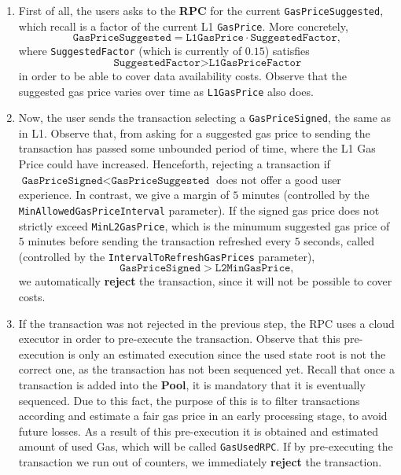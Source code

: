\begin{enumerate}

\item First of all, the users asks to the \textbf{RPC} for the current \texttt{GasPriceSuggested}, which recall is a factor of the current L1 \texttt{GasPrice}. More concretely,
\[
\texttt{GasPriceSuggested} = \texttt{L1GasPrice} \cdot \texttt{SuggestedFactor},
\]
where \texttt{SuggestedFactor} (which is currently of $0.15$) satisfies
\[
\texttt{SuggestedFactor} > \texttt{L1GasPriceFactor}
\]
in order to be able to cover data availability costs. Observe that the suggested gas price varies over time as \texttt{L1GasPrice} also does.

\item Now, the user sends the transaction selecting a \texttt{GasPriceSigned}, the same as in L1. Observe that, from asking for a suggested gas price to sending the transaction has passed some unbounded period of time, where the L1 Gas Price could have increased. Henceforth, rejecting a transaction if $\texttt{GasPriceSigned} < \texttt{GasPriceSuggested}$ does not offer a good user experience. In contrast, we give a margin of $5$ minutes (controlled by the \texttt{MinAllowedGasPriceInterval} parameter). If the signed gas price does not strictly exceed \texttt{MinL2GasPrice}, which is the minumum suggested gas price of $5$ minutes before sending the transaction refreshed every $5$ seconds, called (controlled by the \texttt{IntervalToRefreshGasPrices} parameter),
\[
\texttt{GasPriceSigned} > \texttt{L2MinGasPrice},
\]
we automatically \textbf{reject} the transaction, since it will not be possible to cover costs.

\item If the transaction was not rejected in the previous step, the RPC uses a cloud executor in order to pre-execute the transaction. Observe that this pre-execution is only an estimated execution since the used state root is not the correct one, as the transaction has not been sequenced yet. Recall that once a transaction is added into the \textbf{Pool}, it is mandatory that it is eventually sequenced. Due to this fact, the purpose of this is to filter transactions according and estimate a fair gas price in an early processing stage, to avoid future losses. As a result of this pre-execution it is obtained and estimated amount of used Gas, which will be called \texttt{GasUsedRPC}. If by pre-executing the transaction we run out of counters, we immediately \textbf{reject} the transaction.


\end{enumerate}
